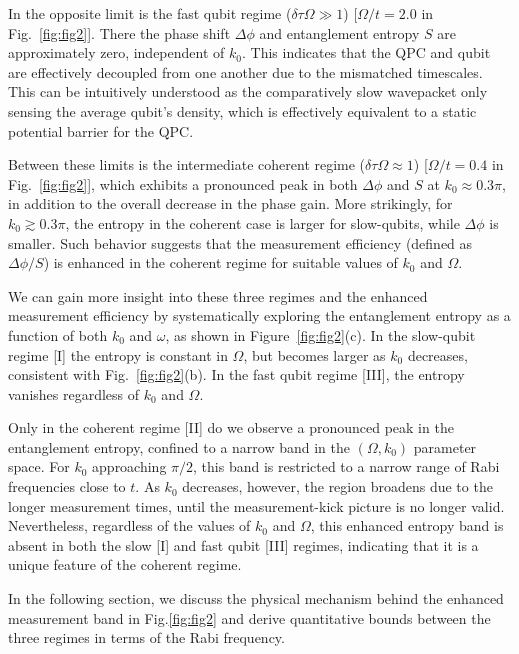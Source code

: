 \documentclass[10pt,
 amsmath,amssymb,
 aps,prb, twocolumn
]{revtex4-2}
\newcommand\sj[1]{ {\color{cyan} #1} }
\begin{document}
In the opposite limit is the fast qubit regime (\mbox{$\delta \tau\Omega \gg 1$}) [\mbox{$\Omega/t = 2.0$} in Fig.~\ref{fig:fig2}]. There the phase shift $\Delta \phi$ and entanglement entropy $S$ are approximately zero, independent of $k_0$. This indicates that the QPC and qubit are effectively decoupled from one another due to the mismatched timescales. This can be intuitively understood as the comparatively slow wavepacket only sensing the average qubit's density, which is effectively equivalent to a static potential barrier for the QPC.

Between these limits is  the intermediate coherent regime (\mbox{$\delta \tau \Omega  \approx 1$}) [\mbox{$\Omega/t = 0.4$} in Fig.~\ref{fig:fig2}], which exhibits a pronounced peak in both \mbox{$\Delta\phi$} and \mbox{$S$} at $k_0 \approx 0.3\pi$, in addition to the overall decrease in the phase gain. More strikingly, for $k_0\gtrsim 0.3\pi$, the entropy in the coherent case is larger for slow-qubits, while $\Delta \phi$ is smaller. Such behavior suggests that the measurement efficiency (defined as \mbox{$\Delta \phi / S$}) is enhanced in the coherent regime for suitable values of $k_0$ and $\Omega$.

We can gain more insight into these three regimes and the enhanced measurement efficiency by systematically exploring the entanglement entropy as a function of both \mbox{$k_0$} and \mbox{$\omega$}, as shown in Figure~\ref{fig:fig2}(c). In the slow-qubit regime [I] the entropy is constant in $\Omega$, but becomes larger as $k_0$ decreases, consistent with Fig.~\ref{fig:fig2}(b). In the fast qubit regime [III], the entropy vanishes regardless of $k_0$ and $\Omega$.

Only in the coherent regime [II] do we observe a pronounced peak in the entanglement entropy, confined to a narrow band in the $(\Omega,k_0)$ parameter space. For $k_0$ approaching $\pi/2$, this band is restricted to a narrow range of Rabi frequencies close to $t$. As $k_0$ decreases, however, the region broadens due to the longer measurement times, until the \sj{measurement-kick picture} is no longer valid. Nevertheless, regardless of the values of $k_0$ and $\Omega$, this enhanced entropy band is absent in both the slow [I] and fast qubit [III] regimes, indicating that it is a unique feature of the coherent regime.
 
In the following section, we discuss the physical mechanism behind the enhanced measurement band in Fig.\ref{fig:fig2} and derive quantitative bounds between the three regimes in terms of the Rabi frequency.
\end{document}
